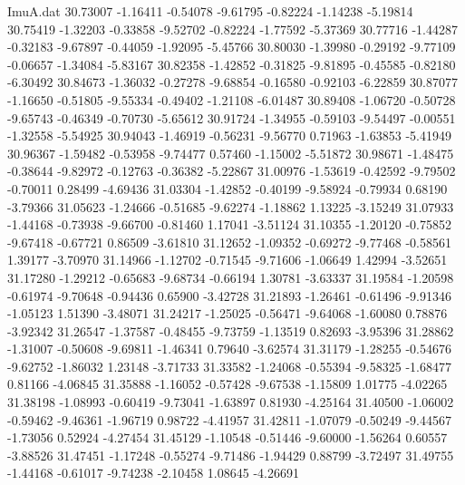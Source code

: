 \begin{filecontents}{ImuA.dat}
  30.73007   -1.16411   -0.54078   -9.61795   -0.82224   -1.14238   -5.19814
  30.75419   -1.32203   -0.33858   -9.52702   -0.82224   -1.77592   -5.37369
  30.77716   -1.44287   -0.32183   -9.67897   -0.44059   -1.92095   -5.45766
  30.80030   -1.39980   -0.29192   -9.77109   -0.06657   -1.34084   -5.83167
  30.82358   -1.42852   -0.31825   -9.81895   -0.45585   -0.82180   -6.30492
  30.84673   -1.36032   -0.27278   -9.68854   -0.16580   -0.92103   -6.22859
  30.87077   -1.16650   -0.51805   -9.55334   -0.49402   -1.21108   -6.01487
  30.89408   -1.06720   -0.50728   -9.65743   -0.46349   -0.70730   -5.65612
  30.91724   -1.34955   -0.59103   -9.54497   -0.00551   -1.32558   -5.54925
  30.94043   -1.46919   -0.56231   -9.56770    0.71963   -1.63853   -5.41949
  30.96367   -1.59482   -0.53958   -9.74477    0.57460   -1.15002   -5.51872
  30.98671   -1.48475   -0.38644   -9.82972   -0.12763   -0.36382   -5.22867
  31.00976   -1.53619   -0.42592   -9.79502   -0.70011    0.28499   -4.69436
  31.03304   -1.42852   -0.40199   -9.58924   -0.79934    0.68190   -3.79366
  31.05623   -1.24666   -0.51685   -9.62274   -1.18862    1.13225   -3.15249
  31.07933   -1.44168   -0.73938   -9.66700   -0.81460    1.17041   -3.51124
  31.10355   -1.20120   -0.75852   -9.67418   -0.67721    0.86509   -3.61810
  31.12652   -1.09352   -0.69272   -9.77468   -0.58561    1.39177   -3.70970
  31.14966   -1.12702   -0.71545   -9.71606   -1.06649    1.42994   -3.52651
  31.17280   -1.29212   -0.65683   -9.68734   -0.66194    1.30781   -3.63337
  31.19584   -1.20598   -0.61974   -9.70648   -0.94436    0.65900   -3.42728
  31.21893   -1.26461   -0.61496   -9.91346   -1.05123    1.51390   -3.48071
  31.24217   -1.25025   -0.56471   -9.64068   -1.60080    0.78876   -3.92342
  31.26547   -1.37587   -0.48455   -9.73759   -1.13519    0.82693   -3.95396
  31.28862   -1.31007   -0.50608   -9.69811   -1.46341    0.79640   -3.62574
  31.31179   -1.28255   -0.54676   -9.62752   -1.86032    1.23148   -3.71733
  31.33582   -1.24068   -0.55394   -9.58325   -1.68477    0.81166   -4.06845
  31.35888   -1.16052   -0.57428   -9.67538   -1.15809    1.01775   -4.02265
  31.38198   -1.08993   -0.60419   -9.73041   -1.63897    0.81930   -4.25164
  31.40500   -1.06002   -0.59462   -9.46361   -1.96719    0.98722   -4.41957
  31.42811   -1.07079   -0.50249   -9.44567   -1.73056    0.52924   -4.27454
  31.45129   -1.10548   -0.51446   -9.60000   -1.56264    0.60557   -3.88526
  31.47451   -1.17248   -0.55274   -9.71486   -1.94429    0.88799   -3.72497
  31.49755   -1.44168   -0.61017   -9.74238   -2.10458    1.08645   -4.26691

\end{filecontents}
